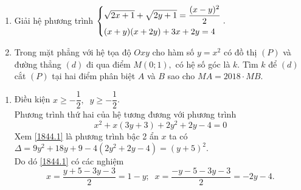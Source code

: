 \begin{ex}%
  
    \begin{enumerate}
        \item Giải hệ phương trình $\left\{\begin{aligned}& \sqrt{2x+1}+\sqrt{2y+1}=\dfrac{(x-y)^2}{2}\\ &(x+y)(x+2y)+3x+2y=4\end{aligned}\right..$
        \item Trong mặt phẳng với hệ tọa độ $Oxy$ cho hàm số $y=x^2$ có đồ thị $(P)$ và đường thẳng $(d)$ đi qua điểm $M(0;1),$ có hệ số góc là $k$. Tìm $k$ để $(d)$ cắt $(P)$ tại hai điểm phân biệt $A$ và $B$ sao cho $MA=2018\cdot MB.$
     
    \end{enumerate}
\loigiai
    {
     \begin{enumerate}
     	\item Điều kiện $x \ge -\dfrac{1}{2},\;\;y \ge -\dfrac{1}{2} $.\\
     	Phương trình thứ hai của hệ tương đương với phương trình
   	\begin{equation}\label{1844.1} x^2 + x\left( 3y + 3 \right) + 2y^2 + 2y - 4 = 0
   	 \end{equation}   		
   		Xem \eqref{1844.1} là phương trình bậc 2 ẩn $x$ ta có
    	$\Delta = 9y^2 + 18y + 9 - 4\left( 2y^2 + 2y - 4\right) = \left( y + 5 \right)^2$.\\
    	Do dó \eqref{1844.1} có các nghiệm $$x = \dfrac{y + 5 - 3y - 3}{2} = 1 - y;\;\;x = \dfrac{ - y - 5 - 3y - 3}{2} = - 2y - 4.$$
\end{enumerate}}
\end{ex}
